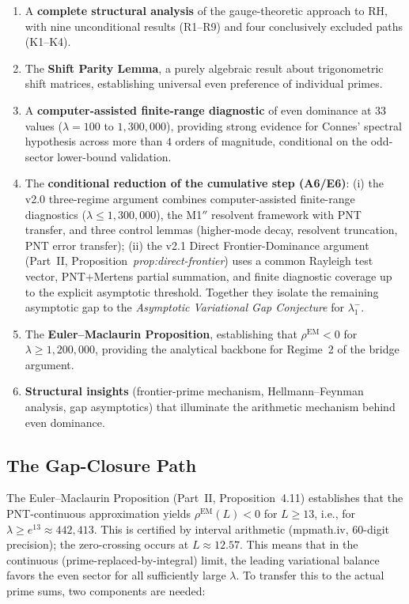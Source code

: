 \documentclass[12pt,a4paper]{article}
\theoremstyle{definition}
\theoremstyle{remark}
\begin{document}
\begin{enumerate}
  \item A \textbf{complete structural analysis} of the gauge-theoretic approach to RH, with nine unconditional results (R1--R9) and four conclusively excluded paths (K1--K4).

  \item The \textbf{Shift Parity Lemma}, a purely algebraic result about trigonometric shift matrices, establishing universal even preference of individual primes.

  \item A \textbf{computer-assisted finite-range diagnostic} of even dominance at $33$ values ($\lambda = 100$ to $1{,}300{,}000$), providing strong evidence for Connes' spectral hypothesis across more than $4$ orders of magnitude, conditional on the odd-sector lower-bound validation.

  \item The \textbf{conditional reduction of the cumulative step (A6/E6)}:
    (i) the v2.0 three-regime argument combines computer-assisted
    finite-range diagnostics ($\lambda \leq 1{,}300{,}000$), the M1$''$ resolvent
    framework with PNT transfer, and three control lemmas (higher-mode
    decay, resolvent truncation, PNT error transfer); (ii) the v2.1 Direct
    Frontier-Dominance argument (Part~II, Proposition~\emph{prop:direct-frontier})
    uses a common Rayleigh test vector, PNT+Mertens partial summation, and
    finite diagnostic coverage up to the explicit asymptotic threshold. Together
    they isolate the remaining asymptotic gap to the
    \emph{Asymptotic Variational Gap Conjecture} for $\lambda_1^-$.

  \item The \textbf{Euler--Maclaurin Proposition}, establishing that $\rho^{\mathrm{EM}} < 0$ for $\lambda \geq 1{,}200{,}000$, providing the analytical backbone for Regime~2 of the bridge argument.

  \item \textbf{Structural insights} (frontier-prime mechanism, Hellmann--Feynman analysis, gap asymptotics) that illuminate the arithmetic mechanism behind even dominance.
\end{enumerate}

\subsection{The Gap-Closure Path}
\label{sec:gap-closure-path}

The Euler--Maclaurin Proposition (Part~II, Proposition~4.11) establishes that
the PNT-continuous approximation yields $\rho^{\mathrm{EM}}(L) < 0$ for
$L \geq 13$, i.e., for $\lambda \geq e^{13} \approx 442{,}413$. This is
certified by interval arithmetic (mpmath.iv, 60-digit precision); the
zero-crossing occurs at $L \approx 12.57$. This means that in the continuous
(prime-replaced-by-integral) limit, the leading variational balance favors the
even sector for all sufficiently large $\lambda$. To transfer this to the
actual prime sums, two components are needed:
\end{document}
